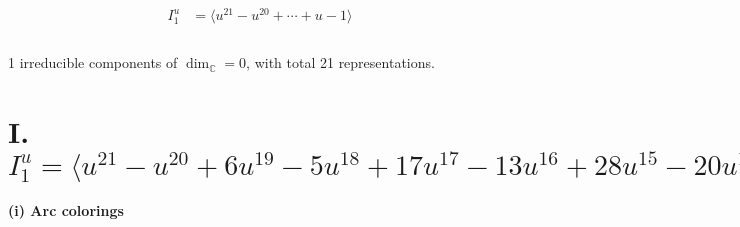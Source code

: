 \documentclass[1p]{elsarticle_modified}
\theoremstyle{definition}
\begin{document}
\begin{align*}
I^u_{1}&=\langle 
u^{21}- u^{20}+\cdots+u-1\rangle \\
\\
\end{align*}
\raggedright * 1 irreducible components of $\dim_{\mathbb{C}}=0$, with total 21 representations.\\
\newpage
\renewcommand{\arraystretch}{1}
\centering \section*{I. $I^u_{1}= \langle u^{21}- u^{20}+6 u^{19}-5 u^{18}+17 u^{17}-13 u^{16}+28 u^{15}-20 u^{14}+28 u^{13}-20 u^{12}+16 u^{11}-11 u^{10}+3 u^9- u^8-2 u^7+4 u^6- u^5+u^4+2 u^3- u^2+u-1 \rangle$}
\flushleft \textbf{(i) Arc colorings}\\
\end{document}
